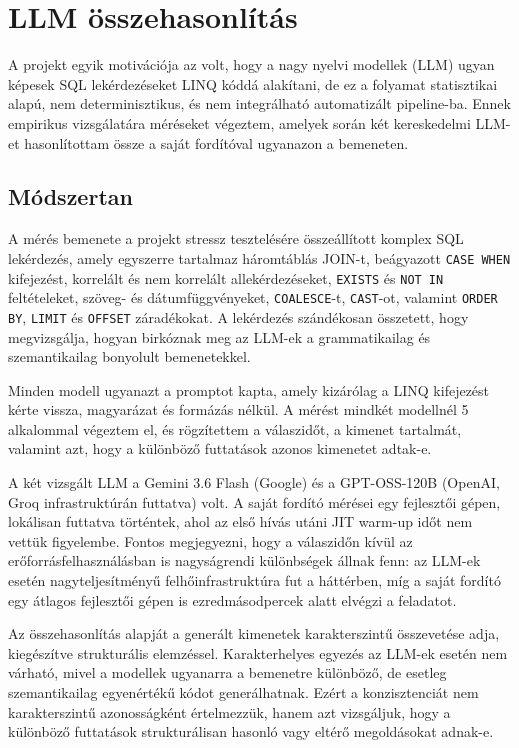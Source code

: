 \documentclass[a4paper,12pt]{article}
\begin{document}
\section{LLM összehasonlítás}

A projekt egyik motivációja az volt, hogy a nagy nyelvi modellek (LLM) ugyan képesek SQL lekérdezéseket LINQ kóddá alakítani, de ez a folyamat statisztikai alapú, nem determinisztikus, és nem integrálható automatizált pipeline-ba. Ennek empirikus vizsgálatára méréseket végeztem, amelyek során két kereskedelmi LLM-et hasonlítottam össze a saját fordítóval ugyanazon a bemeneten.

\subsection{Módszertan}

A mérés bemenete a projekt stressz tesztelésére összeállított komplex SQL lekérdezés, amely egyszerre tartalmaz háromtáblás JOIN-t, beágyazott \texttt{CASE WHEN} kifejezést, korrelált és nem korrelált allekérdezéseket, \texttt{EXISTS} és \texttt{NOT IN} feltételeket, szöveg- és dátumfüggvényeket, \texttt{COALESCE}-t, \texttt{CAST}-ot, valamint \texttt{ORDER BY}, \texttt{LIMIT} és \texttt{OFFSET} záradékokat. A lekérdezés szándékosan összetett, hogy megvizsgálja, hogyan birkóznak meg az LLM-ek a grammatikailag és szemantikailag bonyolult bemenetekkel.

Minden modell ugyanazt a promptot kapta, amely kizárólag a LINQ kifejezést kérte vissza, magyarázat és formázás nélkül. A mérést mindkét modellnél 5 alkalommal végeztem el, és rögzítettem a válaszidőt, a kimenet tartalmát, valamint azt, hogy a különböző futtatások azonos kimenetet adtak-e.

A két vizsgált LLM a Gemini 3.6 Flash (Google) és a GPT-OSS-120B (OpenAI, Groq infrastruktúrán futtatva) volt. A saját fordító mérései egy fejlesztői gépen, lokálisan futtatva történtek, ahol az első hívás utáni JIT warm-up időt nem vettük figyelembe. Fontos megjegyezni, hogy a válaszidőn kívül az erőforrásfelhasználásban is nagyságrendi különbségek állnak fenn: az LLM-ek esetén nagyteljesítményű felhőinfrastruktúra fut a háttérben, míg a saját fordító egy átlagos fejlesztői gépen is ezredmásodpercek alatt elvégzi a feladatot.

Az összehasonlítás alapját a generált kimenetek karakterszintű összevetése adja, kiegészítve strukturális elemzéssel. Karakterhelyes egyezés az LLM-ek esetén nem várható, mivel a modellek ugyanarra a bemenetre különböző, de esetleg szemantikailag egyenértékű kódot generálhatnak. Ezért a konzisztenciát nem karakterszintű azonosságként értelmezzük, hanem azt vizsgáljuk, hogy a különböző futtatások strukturálisan hasonló vagy eltérő megoldásokat adnak-e.
\end{document}
